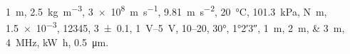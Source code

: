 \documentclass{article}
\begin{document}
\SI{1}{\metre}, \SI{2.5}{\kilo\gram\per\cubic\metre}, \SI{3e8}{\metre\per\second},
\SI{9.81}{\metre\per\second\squared}, \SI{20}{\celsius}, \SI{101.3}{\kilo\pascal},
\si{\newton\metre}, \num{1.5e-3}, \num{12345}, \num{3 +- 0.1},
\SIrange{1}{5}{\volt}, \numrange{10}{20}, \ang{30}, \ang{1;2;3},
\SIlist{1;2;3}{\metre}, \qty{4}{\mega\hertz}, \unit{\kilo\watt\hour}, \SI{0.5}{\micro\metre}.
\end{document}
